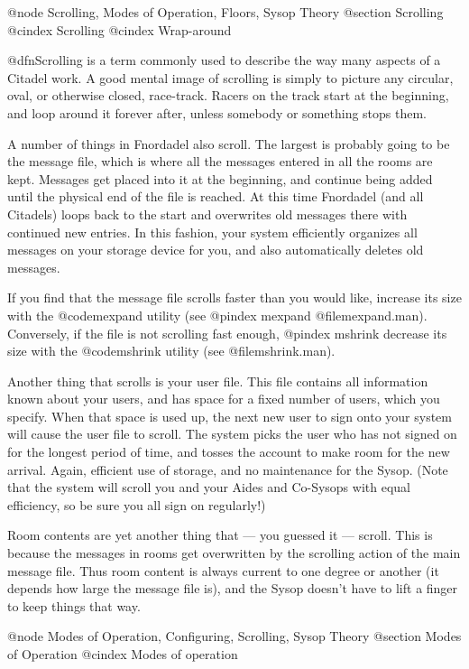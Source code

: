 @node Scrolling, Modes of Operation, Floors, Sysop Theory
@section Scrolling
@cindex Scrolling
@cindex Wrap-around

@dfn{Scrolling} is a term commonly used to describe the way
many aspects of a Citadel work.  A good mental
image of scrolling is simply to picture any circular, oval, or
otherwise closed, race-track.  Racers on the track start at the
beginning, and loop around it forever after, unless somebody or
something stops them.

A number of things in Fnordadel also scroll.  The largest
is probably going to be the message file, which is where all the
messages entered in all the rooms are kept.  Messages get placed into
it at the beginning, and continue being added until the physical end
of the file is reached.  At this time Fnordadel (and all Citadels)
loops back to the start and overwrites old messages there with
continued new entries.  In this fashion, your system efficiently
organizes all messages on your storage device for you, and also
automatically deletes old messages.

If you find that the message file scrolls faster than you
would like, increase its size with the @code{mexpand} utility (see
@pindex mexpand
@file{mexpand.man}).  Conversely, if the file is not scrolling fast enough,
@pindex mshrink
decrease its size with the @code{mshrink} utility (see @file{mshrink.man}).

Another thing that scrolls is your user file.  This file
contains all information known about your users, and has space for
a fixed number of users, which you specify.  When that space is
used up, the next new user to sign onto your system will cause the
user file to scroll.  The system picks the user who has not signed
on for the longest period of time, and tosses the account to make
room for the new arrival.  Again, efficient use of storage, and no
maintenance for the Sysop.  (Note that the system will scroll you
and your Aides and Co-Sysops with equal efficiency, so be sure you all
sign on regularly!)

Room contents are yet another thing that --- you guessed it ---
scroll.  This is because the messages in rooms get overwritten by
the scrolling action of the main message file.  Thus room content
is always current to one degree or another (it depends how large the
message file is), and the Sysop doesn't have to lift a finger to
keep things that way.

@node Modes of Operation, Configuring, Scrolling, Sysop Theory
@section Modes of Operation
@cindex Modes of operation

